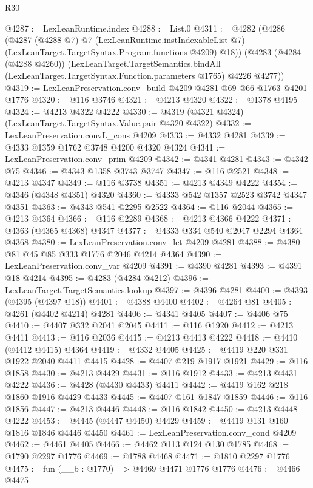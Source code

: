 \begin{lexlean}{R30}
\begin{coremodule}
{{{{{@4287 := LexLeanRuntime.index
@4288 := List.{0}
@4311 := @4282
    (@4286
      (@4287
        (@4288 @7)
        @7
        (LexLeanRuntime.instIndexableList @7)
        (LexLeanTarget.TargetSyntax.Program.functions @4209)
        @18))
    (@4283
      (@4284 (@4288 @4260))
      (LexLeanTarget.TargetSemantics.bindAll
        (LexLeanTarget.TargetSyntax.Function.parameters @1765)
        @4226
        @4277))
@4319 := LexLeanPreservation.conv_build @4209 @4281 @69 @66 @1763 @4201 @1776
@4320 := @116 @3746
@4321 := @4213 @4320
@4322 := @1378 @4195
@4324 := @4213 @4322 @4222
@4330 := @4319 (@4321 @4324) (LexLeanTarget.TargetSyntax.Value.pair @4320 @4322)
@4332 := LexLeanPreservation.convL_cons @4209
@4333 := @4332 @4281
@4339 := @4333 @1359 @1762 @3748 @4200 @4320 @4324
@4341 := LexLeanPreservation.conv_prim @4209
@4342 := @4341 @4281
@4343 := @4342 @75
@4346 := @4343 @1358 @3743 @3747
@4347 := @116 @2521
@4348 := @4213 @4347
@4349 := @116 @3738
@4351 := @4213 @4349 @4222
@4354 := @4346 (@4348 @4351) @4320
@4360 := @4333 @542 @1357 @2523 @3742 @4347 @4351
@4363 := @4343 @541 @2295 @2522
@4364 := @116 @2044
@4365 := @4213 @4364
@4366 := @116 @2289
@4368 := @4213 @4366 @4222
@4371 := @4363 (@4365 @4368) @4347
@4377 := @4333 @334 @540 @2047 @2294 @4364 @4368
@4380 := LexLeanPreservation.conv_let @4209 @4281
@4388 := @4380 @81 @45 @85 @333 @1776 @2046 @4214 @4364
@4390 := LexLeanPreservation.conv_var @4209
@4391 := @4390 @4281
@4393 := @4391 @18 @4214
@4395 := @4283 (@4284 @4212)
@4396 := LexLeanTarget.TargetSemantics.lookup
@4397 := @4396 @4281
@4400 := @4393 (@4395 (@4397 @18))
@4401 := @4388 @4400
@4402 := @4264 @81
@4405 := @4261 (@4402 @4214) @4281
@4406 := @4341 @4405
@4407 := @4406 @75
@4410 := @4407 @332 @2041 @2045
@4411 := @116 @1920
@4412 := @4213 @4411
@4413 := @116 @2036
@4415 := @4213 @4413 @4222
@4418 := @4410 (@4412 @4415) @4364
@4419 := @4332 @4405
@4425 := @4419 @220 @331 @1922 @2040 @4411 @4415
@4428 := @4407 @219 @1917 @1921
@4429 := @116 @1858
@4430 := @4213 @4429
@4431 := @116 @1912
@4433 := @4213 @4431 @4222
@4436 := @4428 (@4430 @4433) @4411
@4442 := @4419 @162 @218 @1860 @1916 @4429 @4433
@4445 := @4407 @161 @1847 @1859
@4446 := @116 @1856
@4447 := @4213 @4446
@4448 := @116 @1842
@4450 := @4213 @4448 @4222
@4453 := @4445 (@4447 @4450) @4429
@4459 := @4419 @131 @160 @1816 @1846 @4446 @4450
@4461 := LexLeanPreservation.conv_cond @4209
@4462 := @4461 @4405
@4466 := @4462 @113 @124 @130 @1785
@4468 := @1790 @2297 @1776
@4469 := @1788 @4468
@4471 := @1810 @2297 @1776
@4475 := fun (__b : @1770) => @4469 @4471 @1776 @1776
@4476 := @4466 @4475
}}}}}
\end{coremodule}
\end{lexlean}
